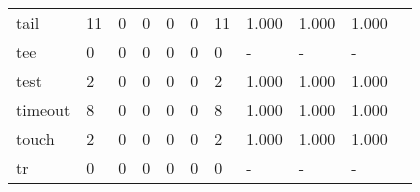 \begin{longtable}{lp{1.20cm}p{1.20cm}p{1.20cm}p{1.20cm}p{1.20cm}p{1.20cm}p{1.20cm}p{1.20cm}p{1.20cm}p{1.20cm}}
tail      &                                    11 &                                                  0 &                                                  0 &                                                  0 &                                                  0 &                                                 11 &                                         1.000 &                                              1.000 &                                              1.000 \\
tee       &                                     0 &                                                  0 &                                                  0 &                                                  0 &                                                  0 &                                                  0 &                                             - &                                                  - &                                                  - \\
test      &                                     2 &                                                  0 &                                                  0 &                                                  0 &                                                  0 &                                                  2 &                                         1.000 &                                              1.000 &                                              1.000 \\
timeout   &                                     8 &                                                  0 &                                                  0 &                                                  0 &                                                  0 &                                                  8 &                                         1.000 &                                              1.000 &                                              1.000 \\
touch     &                                     2 &                                                  0 &                                                  0 &                                                  0 &                                                  0 &                                                  2 &                                         1.000 &                                              1.000 &                                              1.000 \\
tr        &                                     0 &                                                  0 &                                                  0 &                                                  0 &                                                  0 &                                                  0 &                                             - &                                                  - &                                                  - \\

\end{longtable}
